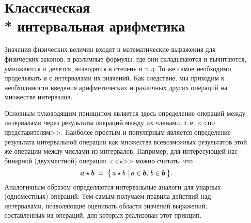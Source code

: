 \documentclass[a5paper,openany]{book}
\newcommand{\mbf}[1]{\protect\text{\boldmath$#1$}}
\begin{document}
  
\section[Классическая интервальная арифметика]%
        {Классическая \\* интервальная арифметика} 
  
Значения физических величин входят в математические выражения для физических законов, 
в различные формулы, где они складываются и вычитаются, умножаются и делятся, возводятся 
в степень и т.\,д. То же самое необходимо проделывать и с интервалами их значений. 
Как  следствие, мы приходим к необходимости введения арифметических и различных других 
операций на множестве интервалов. 
  
Основным руководящим принципом является здесь определение операций между интервалами 
через результаты операций между их членами, т.\,е. <<по представителям>>. Наиболее 
простым и популярным является определение результата интервальной операции 
как множества всевозможных результатов этой же операции между числами из интервалов. 
Например, для интересующей нас бинарной (двухместной) операции <<$\star$>> можно 
считать, что 
\begin{equation} 
\label{IAMainPrinciple} 
\mbf{a}\star\mbf{b}\; = 
   \;\bigl\{\, a\star b \mid a\in\mbf{b}, \,b\in\mbf{b}\, \bigr\}.   
\end{equation} 
Аналогичным образом определяются интервальные аналоги для унарных (одноместных) 
операций. Тем самым получаем правила действий над  интервалами, позволяющие оценивать 
области значений выражений, составленных из операций, для которых реализован этот 
принцип. 
  
\end{document}
